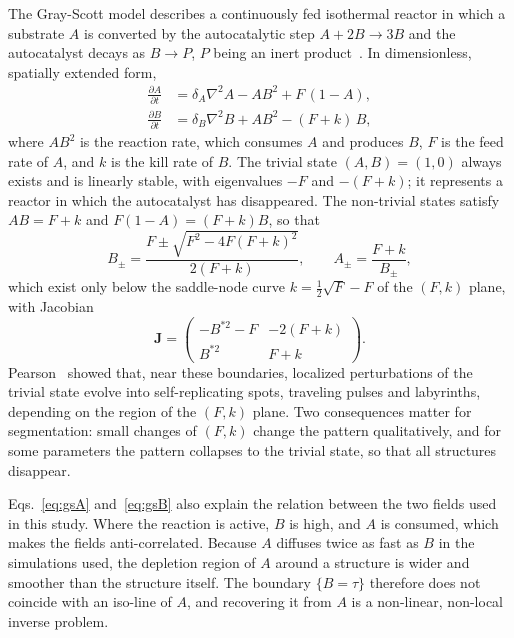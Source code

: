 \documentclass[final,5p,times,twocolumn]{elsarticle}
\begin{document}
The Gray-Scott model describes a continuously fed isothermal reactor in which a substrate $A$ is converted by the autocatalytic step $A+2B\rightarrow 3B$ and the autocatalyst decays as $B\rightarrow P$, $P$ being an inert product~\cite{gray1983,gray1984}. In dimensionless, spatially extended form,
\begin{subequations}\label{eq:gs}
\begin{align}
\frac{\partial A}{\partial t} &= \delta_A\nabla^2 A - A B^2 + F\,(1-A), \label{eq:gsA}\\
\frac{\partial B}{\partial t} &= \delta_B\nabla^2 B + A B^2 - (F+k)\,B, \label{eq:gsB}
\end{align}
\end{subequations}
where $AB^2$ is the reaction rate, which consumes $A$ and produces $B$, $F$ is the feed rate of $A$, and $k$ is the kill rate of $B$. The trivial state $(A,B)=(1,0)$ always exists and is linearly stable, with eigenvalues $-F$ and $-(F+k)$; it represents a reactor in which the autocatalyst has disappeared. The non-trivial states satisfy $AB=F+k$ and $F(1-A)=(F+k)B$, so that
\begin{equation}\label{eq:gsfixed}
B_\pm=\frac{F\pm\sqrt{F^2-4F(F+k)^2}}{2(F+k)},\qquad A_\pm=\frac{F+k}{B_\pm},
\end{equation}
which exist only below the saddle-node curve $k=\tfrac12\sqrt{F}-F$ of the $(F,k)$ plane, with Jacobian
\begin{equation}\label{eq:gsjac}
\mathbf{J}=\begin{pmatrix} -B^{*2}-F & -2(F+k)\\ B^{*2} & F+k\end{pmatrix}.
\end{equation}
Pearson~\cite{pearson1993} showed that, near these boundaries, localized perturbations of the trivial state evolve into self-replicating spots, traveling pulses and labyrinths, depending on the region of the $(F,k)$ plane. Two consequences matter for segmentation: small changes of $(F,k)$ change the pattern qualitatively, and for some parameters the pattern collapses to the trivial state, so that all structures disappear.

Eqs.~\eqref{eq:gsA} and~\eqref{eq:gsB} also explain the relation between the two fields used in this study. Where the reaction is active, $B$ is high, and $A$ is consumed, which makes the fields anti-correlated. Because $A$ diffuses twice as fast as $B$ in the simulations used, the depletion region of $A$ around a structure is wider and smoother than the structure itself. The boundary $\{B=\tau\}$ therefore does not coincide with an iso-line of $A$, and recovering it from $A$ is a non-linear, non-local inverse problem.
\end{document}
